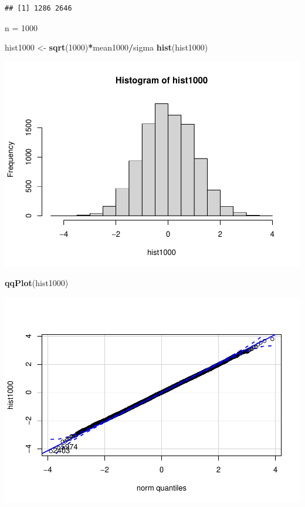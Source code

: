 \documentclass[
]{article}
\newenvironment{Shaded}{\begin{snugshade}}{\end{snugshade}}
\newcommand{\DecValTok}[1]{\textcolor[rgb]{0.00,0.00,0.81}{#1}}
\newcommand{\KeywordTok}[1]{\textcolor[rgb]{0.13,0.29,0.53}{\textbf{#1}}}
\newcommand{\NormalTok}[1]{#1}
\newcommand{\OperatorTok}[1]{\textcolor[rgb]{0.81,0.36,0.00}{\textbf{#1}}}
\newcommand{\StringTok}[1]{\textcolor[rgb]{0.31,0.60,0.02}{#1}}
\begin{document}
\begin{verbatim}
## [1] 1286 2646
\end{verbatim}

n = 1000

\begin{Shaded}
\begin{Highlighting}[]
\NormalTok{hist1000 <-}\StringTok{ }\KeywordTok{sqrt}\NormalTok{(}\DecValTok{1000}\NormalTok{)}\OperatorTok{*}\NormalTok{mean1000}\OperatorTok{/}\NormalTok{sigma}
\KeywordTok{hist}\NormalTok{(hist1000)}
\end{Highlighting}
\end{Shaded}

\includegraphics{stad80a1_files/figure-latex/unnamed-chunk-12-1.pdf}

\begin{Shaded}
\begin{Highlighting}[]
\KeywordTok{qqPlot}\NormalTok{(hist1000)}
\end{Highlighting}
\end{Shaded}

\includegraphics{stad80a1_files/figure-latex/unnamed-chunk-12-2.pdf}
\end{document}
